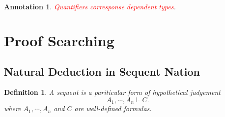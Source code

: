 \documentclass{article}
\theoremstyle{plain}
\newtheorem{definition}[theorem]{Definition}
\newtheorem{annotation}[theorem]{Annotation}
\theoremstyle{nonumberplain}
\newcommand{\redt}[1]{\textcolor{red}{#1}}
\begin{document}
\begin{annotation}
\rm \redt{Quantifiers corresponse dependent types}.
\end{annotation}




\newpage
\section{Proof Searching}

\subsection{Natural Deduction in Sequent Nation}

\begin{definition}
\rm A sequent is a pariticular form of hypothetical judgement
$$
A_1, \cdots, A_n \vdash C.
$$
where $A_1,\cdots,A_n$ and $C$ are well-defined formulas.
\end{definition}
\end{document}
